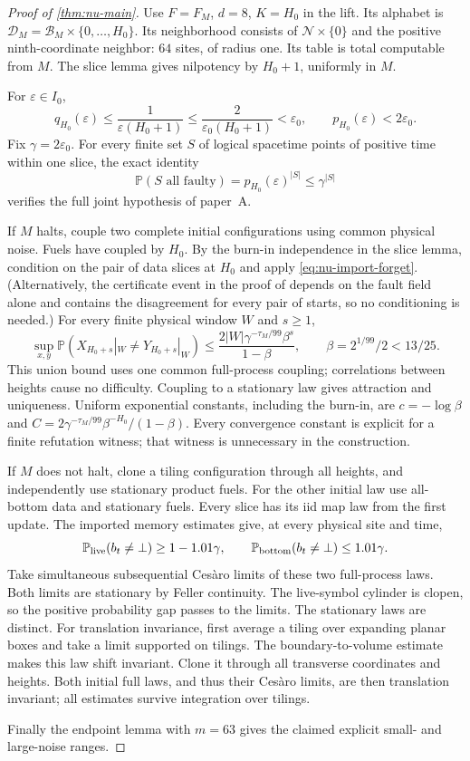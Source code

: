 \documentclass[11pt]{article}
\theoremstyle{plain}
\theoremstyle{definition}
\theoremstyle{remark}
\newcommand{\Prob}{\mathbb P}
\newcommand{\eps}{\varepsilon}
\begin{document}
\begin{proof}[Proof of \cref{thm:nu-main}]
Use $F=F_M$, $d=8$, $K=H_0$ in the lift. Its alphabet is $\mathcal D_M=\mathcal B_M\times\{0,\ldots,H_0\}$. Its neighborhood consists of $\mathcal N\times\{0\}$ and the positive ninth-coordinate neighbor: $64$ sites, of radius one. Its table is total computable from $M$. The slice lemma gives nilpotency by $H_0+1$, uniformly in $M$.

For $\eps\in I_0$,
\[
 q_{H_0}(\eps)\le\frac1{\eps(H_0+1)}
 \le\frac2{\eps_0(H_0+1)}<\eps_0,\qquad p_{H_0}(\eps)<2\eps_0.
\]
Fix $\gamma=2\eps_0$. For every finite set $S$ of logical spacetime points of positive time within one slice, the exact identity
\[
 \Prob(S\text{ all faulty})=p_{H_0}(\eps)^{|S|}\le\gamma^{|S|}
\]
verifies the full joint hypothesis of paper~A.

If $M$ halts, couple two complete initial configurations using common physical noise. Fuels have coupled by $H_0$. By the burn-in independence in the slice lemma, condition on the pair of data slices at $H_0$ and apply \eqref{eq:nu-import-forget}. (Alternatively, the certificate event in the proof of \cite[Lemma~8.11(ii)]{DM26A} depends on the fault field alone and contains the disagreement for every pair of starts, so no conditioning is needed.) For every finite physical window $W$ and $s\ge1$,
\begin{equation}\label{eq:nu-global-forget}
 \sup_{x,y}\Prob(X_{H_0+s}|_W\ne Y_{H_0+s}|_W)
 \le\frac{2|W|\gamma^{-\tau_M/99}\beta^s}{1-\beta},
 \qquad \beta=2^{1/99}/2<13/25 .
\end{equation}
This union bound uses one common full-process coupling; correlations between heights cause no difficulty. Coupling to a stationary law gives attraction and uniqueness. Uniform exponential constants, including the burn-in, are $c=-\log\beta$ and $C=2\gamma^{-\tau_M/99}\beta^{-H_0}/(1-\beta)$. Every convergence constant is explicit for a finite refutation witness; that witness is unnecessary in the construction.

If $M$ does not halt, clone a tiling configuration through all heights, and independently use stationary product fuels. For the other initial law use all-bottom data and stationary fuels. Every slice has its iid map law from the first update. The imported memory estimates give, at every physical site and time,
\[
 \Prob_{\rm live}(b_t\ne\bot)\ge1-1.01\gamma,\qquad
 \Prob_{\rm bottom}(b_t\ne\bot)\le1.01\gamma.
\]
Take simultaneous subsequential Ces\`aro limits of these two full-process laws. Both limits are stationary by Feller continuity. The live-symbol cylinder is clopen, so the positive probability gap passes to the limits. The stationary laws are distinct. For translation invariance, first average a tiling over expanding planar boxes and take a limit supported on tilings. The boundary-to-volume estimate makes this law shift invariant. Clone it through all transverse coordinates and heights. Both initial full laws, and thus their Ces\`aro limits, are then translation invariant; all estimates survive integration over tilings.

Finally the endpoint lemma with $m=63$ gives the claimed explicit small- and large-noise ranges.
\end{proof}
\end{document}
